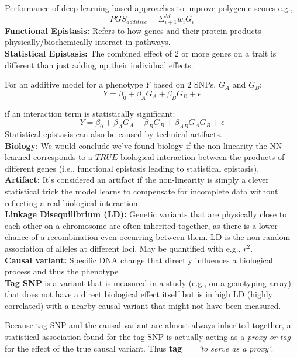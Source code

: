 \documentclass[twocolumn]{article}
\begin{document}
\begin{literaturepaper}{Performance of deep-learning-based approaches to improve polygenic scores \cite{Kelemen2025PolygenicScores}}
e.g.,
\[PGS_{additive}=\Sigma^M_{i+1}w_iG_i\]
\textbf{Functional Epistasis:} Refers to how genes and their protein products physically/biochemically interact in pathways.\\
\textbf{Statistical Epistasis:} The combined effect of $2$ or more genes on a trait is different than just adding up their individual effects.

For an additive model for a phenotype $Y$ based on $2$ SNPs, $G_A$ and $G_B$:
\[ Y = \beta_0 + \beta_A G_A + \beta_BG_B + \epsilon \]

if an interaction term is statistically significant:
\[ Y = \beta_0 + \beta_A G_A + \beta_BG_B +  \beta_{AB}G_AG_B +\epsilon\]
Statistical epistasis can also be caused by technical artifacts.\\

\textbf{Biology}: We would conclude we've found biology if the non-linearity the NN learned corresponds to a $TRUE$ biological interaction between the products of different genes (i.e., functional epistasis leading to statistical epistasis).\\

\textbf{Artifact:} It's considered an artifact if the non-linearity is simply a clever statistical trick the model learns to compensate for incomplete data without reflecting a real biological interaction.\\


\textbf{Linkage Disequilibrium (LD):} Genetic variants that are physically close to each other on a chromosome are often inherited together, as there is a lower chance of a recombination even occurring between them. LD is the non-random association of alleles at different loci. May be quantified with e.g., $r^2$.\\

\textbf{Causal variant:} Specific DNA change that directly influences a biological process and thus the phenotype\\

\textbf{Tag SNP} is a variant that is measured in a study (e.g., on a genotyping array) that does not have a direct biological effect itself but is in high LD (highly correlated) with a nearby causal variant that might not have been measured. 

Because tag SNP and the causal variant are almost always inherited together, a statistical association found for the tag SNP is actually acting as a \textit{proxy or tag} for the effect of the true causal variant. Thus \textbf{tag} $=$ \textit{'to serve as a proxy'}.\\


\end{literaturepaper}
\end{document}
